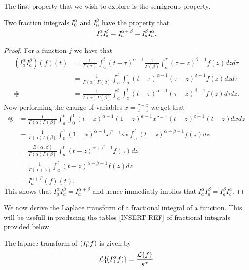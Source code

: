 The first property that we wish to explore is the semigroup property.
\begin{lemma}
    Two fraction integrals $ I_0^\alpha $ and $ I_0^\beta $ have the property that
    \begin{align}
        I_a^\alpha I_a^\beta = I_a^{\alpha + \beta} = I_a^\beta I_a^\alpha.
    \end{align}
\end{lemma} 
\begin{proof}
    For a function $ f $ we have that
    \begin{align}
        (I_a^\alpha I_a^\beta)(f)(t) &= \frac{1}{\Gamma(\alpha)}\int_a^t (t-\tau)^{\alpha - 1}  \frac{1}{\Gamma(\beta)}\int_a^\tau (\tau - z)^{\beta - 1}f(z) dz d\tau \\
            &=\frac{1}{\Gamma(\alpha)\Gamma(\beta)} \int_a^t \int_a^\tau  (t-\tau)^{\alpha - 1}(\tau - z)^{\beta - 1}f(z) dz d\tau \\
            \circledast  &= \frac{1}{\Gamma(\alpha)\Gamma(\beta)} \int_a^t \int_z^t (t-\tau)^{\alpha - 1} (\tau - z)^{\beta - 1} f(z) d\tau dz.
    \end{align}
    Now performing the change of variables $ x = \frac{\tau - z}{t - z} $ we get that
    \begin{align}
        \circledast
        &= \frac{1}{\Gamma(\alpha)\Gamma(\beta)}\int_a^t \int_0^1 (t-z)^{\alpha - 1} (1-z)^{\alpha-1} x^{\beta - 1} (t-z)^{\beta - 1}(t-z) dx dz \\
        &= \frac{1}{\Gamma(\alpha)\Gamma(\beta)}\int_0^1 (1-x)^{\alpha - 1} x^{\beta - 1} dx \int_a^t (t-z)^{\alpha + \beta - 1} f(z) dz \\
        &= \frac{B(\alpha,\beta)}{\Gamma(\alpha)\Gamma(\beta)} \int_a^t (t-z)^{\alpha + \beta - 1} f(z) dz \\
        &= \frac{1}{\Gamma(\alpha + \beta)} \int_a^t (t-z)^{\alpha + \beta - 1} f(z) dz \\
        &= I_a^{\alpha + \beta}(f)(t).
    \end{align}
    This shows that $ I_a^\alpha I_a^\beta = I_a^{\alpha + \beta} $ and hence immediatly implies that $ I_a^\alpha I_a^\beta = I_a^\beta I_a^\alpha $.
\end{proof}
We now derive the Laplace transform of a fractional integral of a function. This will be usefull in producing the tables [INSERT REF] of fractional integrals provided below.
\begin{lemma}
    \label{lem:rli_laplace}
    The laplace transform of $ \left( I_{0}^{\alpha} f \right) $ is given by
    \begin{align}
        \mathcal{L}\{ \left( I_{0}^{\alpha} f \right) \} = \frac{\mathcal{L}\{f\}}{s^\alpha}
    \end{align}
\end{lemma}
